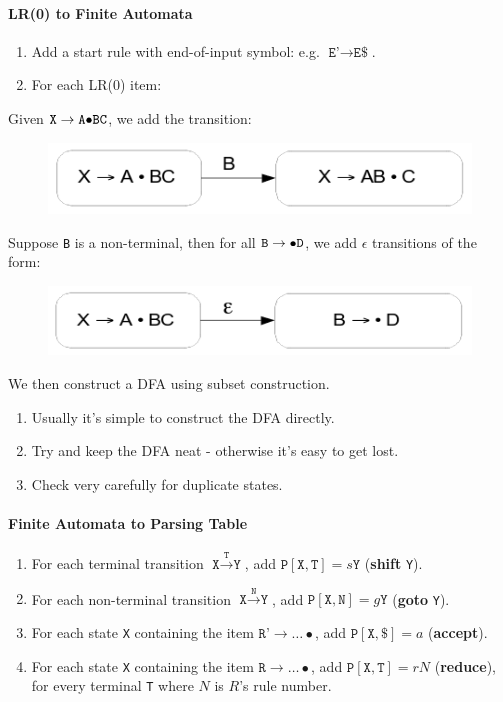 \documentclass[twocolumn,english]{article}
\begin{document}
\paragraph{LR(0) to Finite Automata}
\begin{enumerate}
\item Add a start rule with end-of-input symbol: e.g. $\texttt{E'}\rightarrow\texttt{E}\texttt{\$}$.
\item For each LR(0) item:
\end{enumerate}
Given $\texttt{X}\rightarrow\texttt{A\ensuremath{\bullet}BC}$, we
add the transition:

\begin{figure}[H]
\centering{}\includegraphics[width=0.4\linewidth]{img/lr0tonfa} 
\end{figure}


Suppose \texttt{B} is a non-terminal, then for all $\texttt{B}\rightarrow\texttt{\ensuremath{\bullet}D}$,
we add $\epsilon$ transitions of the form:

\begin{figure}[H]
\centering{}\includegraphics[width=0.4\linewidth]{img/lr0tonfa-nonterminal} 
\end{figure}


We then construct a DFA using subset construction.
\begin{enumerate}
\item Usually it's simple to construct the DFA directly.
\item Try and keep the DFA neat - otherwise it's easy to get lost.
\item Check very carefully for duplicate states.
\end{enumerate}

\paragraph{Finite Automata to Parsing Table}
\begin{enumerate}
\item For each terminal transition $\texttt{X}\xrightarrow{\texttt{T}}\texttt{Y}$,
add $\texttt{P}[\texttt{X},\texttt{T}]=s\texttt{Y}$ (\textbf{shift}
\texttt{Y}). 
\item For each non-terminal transition $\texttt{X}\xrightarrow{\texttt{N}}\texttt{Y}$,
add $\texttt{P}[\texttt{X},\texttt{N}]=g\texttt{Y}$ (\textbf{goto}
\texttt{Y}). 
\item For each state \texttt{X} containing the item $\texttt{R'}\rightarrow\dots\bullet$,
add $\texttt{P}[\texttt{X},\texttt{\$}]=a$ (\textbf{accept}). 
\item For each state \texttt{X} containing the item $\texttt{R}\rightarrow\dots\bullet$,
add $\texttt{P}[\texttt{X},\texttt{T}]=rN$ (\textbf{reduce}), for
every terminal \texttt{T} where $N$ is $R$'s rule number. 
\end{enumerate}
\end{document}
